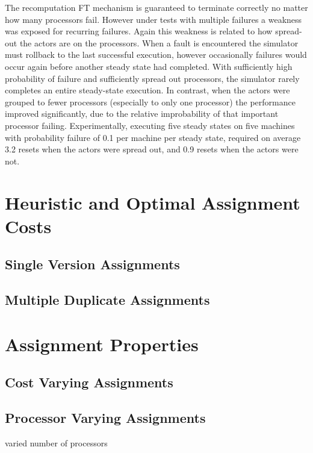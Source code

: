 The recomputation FT mechanism is guaranteed to terminate correctly no matter how many processors fail.
However under tests with multiple failures a weakness was exposed for recurring failures.
Again this weakness is related to how spread-out the actors are on the processors.
When a fault is encountered the simulator must rollback to the last successful execution, however occasionally failures would occur again before another steady state had completed.
With sufficiently high probability of failure and sufficiently spread out processors, the simulator rarely completes an entire steady-state execution.
In contrast, when the actors were grouped to fewer processors (especially to only one processor) the performance improved significantly, due to the relative improbability of that important processor failing.
Experimentally, executing five steady states on five machines with probability failure of 0.1 per machine per steady state, required on average 3.2 resets when the actors were spread out, and 0.9 resets when the actors were not.

\section{Heuristic and Optimal Assignment Costs}

\subsection{Single Version Assignments}

\subsection{Multiple Duplicate Assignments}

\section{Assignment Properties}

\subsection{Cost Varying Assignments}

\subsection{Processor Varying Assignments}

varied number of processors
